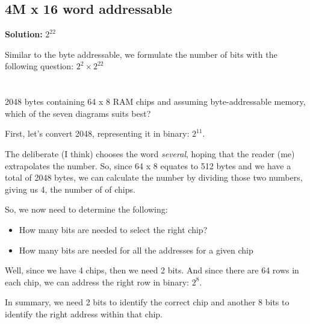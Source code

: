 \documentclass{article}
\begin{document}
\subsection{4M x 16 word addressable}

\textbf{Solution:} $2^{22}$

Similar to the byte addressable, we formulate the number of bits with the following question: $2^2 \times 2^22$ 

\section{}

2048 bytes containing 64 x 8 RAM chips and assuming byte-addressable memory, which of the seven diagrams suits best?

First, let's convert 2048, representing it in binary: $2^11$. 

The deliberate (I think) chooses the word \textit{several}, hoping that the reader (me) extrapolates the number. So, since 64 x 8 equates to 512 bytes and we have a total of 2048 bytes, we can calculate the number by dividing those two numbers, giving us 4, the number of of chips.

So, we now need to determine the following:
\begin{itemize}
    \item How many bits are needed to select the right chip?
    \item How many bits are needed for all the addresses for a given chip
\end{itemize}

Well, since we have 4 chips, then we need 2 bits. And since there are 64 rows in each chip, we can address the right row in binary: $2^8$.

In summary, we need 2 bits to identify the correct chip and another 8 bits to identify the right address within that chip.
\end{document}
